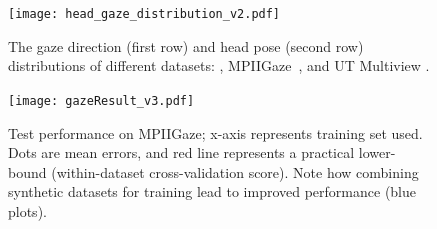 


\begin{figure}
    \centering
    \texttt{[image: head\_gaze\_distribution\_v2.pdf]}
    \caption{The gaze direction (first row) and head pose (second row) distributions of different datasets: \dataset, MPIIGaze~\cite{zhang15_cvpr}, and UT Multiview \cite{sugano2014learning}.}
    \label{fig:head_gaze_distribution}
\end{figure}

\begin{figure}
    \centering
    \texttt{[image: gazeResult\_v3.pdf]}
    \caption{Test performance on MPIIGaze; x-axis represents training set used. Dots are mean errors, and red line represents a practical lower-bound (within-dataset cross-validation score). Note how combining synthetic datasets for training lead to improved performance (blue plots).}
    \label{fig:gazeResult}
\end{figure}

